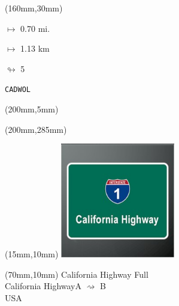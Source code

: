 \begin{textblock*}{40mm}(160mm,30mm)%
\Large
\par$\mapsto$ 0.70 mi.
\par$\mapsto$ 1.13 km
\par$\looparrowright$ 5
\par\hfill\tiny\tt CADWOL\\
\end{textblock*}
\begin{textblock*}{20mm}(200mm,5mm)%
\fbox{\thepage}
\label{CADWOL}
\end{textblock*}
\begin{textblock*}{20mm}(200mm,285mm)%
\fbox{\thepage}
\end{textblock*}

\null\newpage
\begin{textblock*}{50mm}(15mm,10mm)%
\includegraphics[width=50mm]{LG/2015-05-20_00077.png}
\end{textblock*}
\begin{textblock*}{130mm}(70mm,10mm)%
{\fontsize{20}{20}\selectfont California Highway Full\\}
{\fontsize{16}{16}\selectfont California Highway\hfill A $\rightsquigarrow$ B\\}
{\fontsize{12}{12}\selectfont USA\\}
\end{textblock*}
